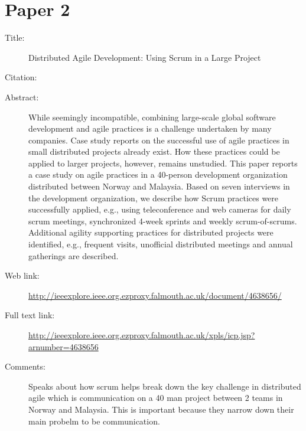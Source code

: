 \documentclass{scrartcl}
\begin{document}
\section*{Paper 2}
\begin{description}
\item[Title:] Distributed Agile Development: Using Scrum in a Large Project
\item[Citation:] \cite{4638656}
\item[Abstract:] While seemingly incompatible, combining large-scale global software development and agile practices is a challenge undertaken by many companies. Case study reports on the successful use of agile practices in small distributed projects already exist. How these practices could be applied to larger projects, however, remains unstudied. This paper reports a case study on agile practices in a 40-person development organization distributed between Norway and Malaysia. Based on seven interviews in the development organization, we describe how Scrum practices were successfully applied, e.g., using teleconference and web cameras for daily scrum meetings, synchronized 4-week sprints and weekly scrum-of-scrums. Additional agility supporting practices for distributed projects were identified, e.g., frequent visits, unofficial distributed meetings and annual gatherings are described.
\item[Web link:] \url{http://ieeexplore.ieee.org.ezproxy.falmouth.ac.uk/document/4638656/}
\item[Full text link:] \url{http://ieeexplore.ieee.org.ezproxy.falmouth.ac.uk/xpls/icp.jsp?arnumber=4638656}
\item[Comments:] Speaks about how scrum helps break down the key challenge in distributed agile which is communication on a 40 man project between 2 teams in Norway and Malaysia. This is important because they narrow down their main probelm to be communication. 
\end{description}
\end{document}
